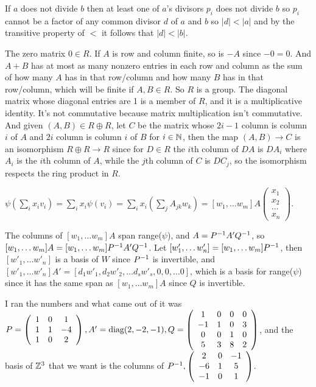 \documentclass[11pt, oneside]{article}   	%
\begin{document}
\item If $a$ does not divide $b$ then at least one of $a$'s divisors $p_i$ does not divide $b$ so $p_i$ cannot be a factor of any common divisor $d$ of $a$ and $b$ so $|d| < |a|$ and by the transitive property of $<$ it follows that $|d| < |b|$.
\ee
\item The zero matrix $0 \in R$. If $A$ is row and column finite, so is $-A$ since $-0 = 0$. And $A + B$ has at most as many nonzero entries in each row and column as the sum of how many $A$ has in that row/column and how many $B$ has in that row/column, which will be finite if $A, B \in R$. So $R$ is a group. The diagonal matrix whose diagonal entries are 1 is a member of $R$, and it is a multiplicative identity. It's not commutative because matrix multiplication isn't commutative. And given $(A, B) \in R \oplus R$, let $C$ be the matrix whose $2i -1$ column is column $i$ of $A$ and $2i$ column is column $i$ of $B$ for $i \in \mathbb{N}$, then the map $(A, B) \to C$ is an isomorphism $R \oplus R \to R$ since for $D \in R$ the $i$th column of $DA$ is $DA_i$ where $A_i$ is the $i$th column of $A$, while the $j$th column of $C$ is $DC_j$, so the isomorphism respects the ring product in $R$.
\item $\psi(\sum_ix_iv_i) = \sum_ix_i\psi(v_i) = \sum_ix_i(\sum_jA_{jk}w_k) = [w_1, \ldots w_m]A \left( \begin{array}{c} x_1 \\ x_2 \\ \ldots \\ x_n \end{array} \right)$.
\item The columns of $[w_1, \ldots w_m]A$ span range($\psi$), and $A = P^{-1} A'Q^{-1}$, so $[w_1, \ldots w_m]A = [w_1, \ldots w_m]P^{-1} A'Q^{-1}$. Let $[w'_1, \ldots w'_n] = [w_1, \ldots w_m]P^{-1}$, then $[w'_1, \ldots w'_n]$ is a basis of $W$ since $P^{-1}$ is invertible, and $[w'_1, \ldots w'_n] A' = [d_1w'_1, d_2w'_2, \ldots d_sw'_s, 0, 0, \ldots 0]$, which is a basis for range($\psi$) since it has the same span as $[w_1, \ldots w_m]A$ since $Q$ is invertible.
\item I ran the numbers and what came out of it was $P = \left( \begin{array}{ccc} 1 & 0 & 1 \\ 1 & 1 & -4 \\ 1 & 0 & 2 \end{array} \right), A' = \text{diag}(2, -2, -1), Q = \left( \begin{array}{cccc} 1 & 0 & 0 & 0 \\ -1 & 1& 0 & 3 \\ 0 & 0 &1 & 0 \\ 5 & 3 & 8 & 2 \end{array} \right)$, and the basis of $\mathbb{Z}^3$ that we want is the columns of $P^{-1}, \left( \begin{array}{ccc} 2 & 0 & -1 \\ -6 & 1 & 5 \\ -1 & 0 & 1 \end{array} \right)$.
\end{document}
